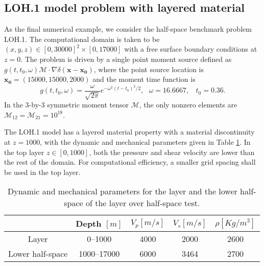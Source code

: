 \subsection{LOH.1 model problem with layered material}
As the final numerical example, we consider the half-space benchmark problem LOH.1. The computational domain is taken to be $(x,y,z)\in[0,30000]^2\times[0,17000]$ with a free surface boundary conditions at $z=0$.   The problem is driven by a single point moment source defined as 
$g(t,t_0,\omega) \mathcal{M} \cdot \nabla\delta (\mathbf{x}-\mathbf{x_0})$, 
where the point source location is $\mathbf{x_0}= (15000, 15000, 2000)$  and the moment time function is
\[g(t,t_0,\omega) = \frac{\omega}{\sqrt{2\pi}}e^{-\omega^2(t - t_0)^2/2}, \ \ \ \omega = 16.6667,\ \ \ \ t_0 = 0.36.\]
In the 3-by-3 symmetric moment tensor $\mathcal{M}$, the only nonzero elements are $\mathcal{M}_{12}=\mathcal{M}_{21}=10^{18}$.

The LOH.1 model has a layered material property with a material discontinuity at $z=1000$, with the dynamic and mechanical parameters given in Table \ref{material_parameter}. In the top layer $z\in [0, 1000]$, both the pressure and shear velocity are lower than the rest of the domain. For computational efficiency, a smaller grid spacing shall be used in the top layer. 

\begin{table}[htbp]
	\begin{center}
		\begin{tabular}{c c c c c}
			\hline
			~   & Depth $[m]$& $V_p[m/s]$ & $V_s [m/s]$ & $\rho[Kg/m^3]$ \\
			\hline
			Layer&0--1000& 4000& 2000& 2600\\
			Lower half-space &1000--17000 & 6000 & 3464& 2700\\
			\hline 
		\end{tabular}
	\end{center}
	\caption{Dynamic and mechanical parameters for the layer and the lower half-space of the layer over half-space test.}\label{material_parameter}
\end{table} 

